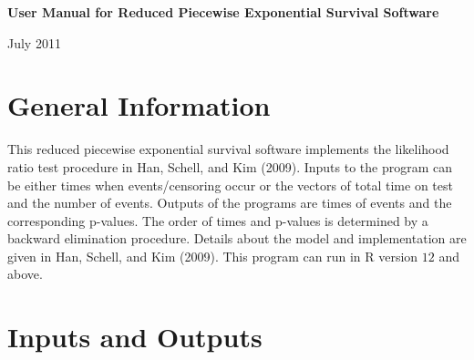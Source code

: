 \documentclass[12pt] {article}
\begin{document}
\begin{center}
{\bf User Manual for Reduced Piecewise Exponential Survival Software}
\end{center}
\vspace{.2in}
\begin{center}
\large{July 2011}
\end{center}

\section{General Information}
This reduced piecewise exponential survival software implements
the likelihood ratio test procedure in Han, Schell, and Kim (2009).
Inputs to the program can be either times when events/censoring
occur or the vectors of total time on test and the number of
events. Outputs of the programs are times of events and
the corresponding p-values. The order of times and p-values
is determined by a backward elimination procedure.
Details about the model and implementation are given in
Han, Schell, and Kim (2009). This program can run in
R version $12$ and above.


\section{Inputs and Outputs}
\end{document}
